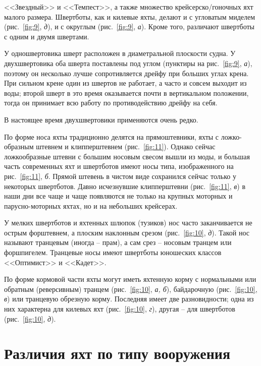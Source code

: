 \documentclass[a4paper, 12pt, twoside, final]{scrbook}
\begin{document}
<<Звездный>> и <<Темпест>>, а также множество крейсерско\-/гоночных яхт
малого размера. Швертботы, как и килевые яхты, делают и с угловатым
миделем (рис.~\ref{fig:9}, \emph{д}), и с округлым (рис.~\ref{fig:9},
\emph{а}). Кроме того, различают швертботы с одним и двумя швертами.

У одношвертовика шверт расположен в диаметральной плоскости судна.
У двухшвертовика оба шверта поставлены под углом (пунктиры на рис.~\ref{fig:9}, \emph{а}), поэтому он несколько лучше сопротивляется дрейфу при больших
углах крена. При сильном крене один из швертов не работает, а часто
и совсем выходит из воды; второй шверт в это время оказывается почти
в вертикальном положении, тогда он принимает всю работу по противодействию
дрейфу на себя.

В настоящее время двухшвертовики применяются очень редко.

По форме носа яхты традиционно делятся на прямоштевники, яхты с ложко-образным
штевнем и клипперштевнем (рис.~\ref{fig:11}).
Однако сейчас ложкообразные штевни с большим носовым свесом вышли
из моды, и большая часть современных яхт и швертботов имеют носы типа,
изображенного на рис.~\ref{fig:11},
\emph{б}. Прямой штевень в чистом виде сохранился сейчас только у
некоторых швертботов. Давно исчезнувшие клипперштевни (рис.~\ref{fig:11},
\emph{в}) в наши дни все чаще и чаще появляются не только на крупных
моторных и парусно-моторных яхтах, но и на небольших крейсерах.

У мелких швертботов и яхтенных шлюпок (тузиков) нос часто заканчивается
не острым форштевнем, а плоским наклонным срезом (рис.~\ref{fig:10},
\emph{д}). Такой нос называют транцевым (иногда \--- прам), а сам срез \--- носовым
транцем или форшпигелем. Транцевые носы имеют швертботы юношеских
классов <<Оптимист>> и <<Кадет>>.

По форме кормовой части яхты могут иметь яхтенную корму с нормальными
или обратным (реверсивным) транцем (рис.~\ref{fig:10},
\emph{а, б}), байдарочную (рис.~\ref{fig:10},
\emph{в}) или транцевую обрезную корму. Последняя имеет две разновидности;
одна из них характерна для килевых яхт (рис.~\ref{fig:10},
\emph{г}), другая \--- для швертботов (рис.~\ref{fig:10},
\emph{д}).

%
%

\section{Различия яхт по типу вооружения}
\end{document}
